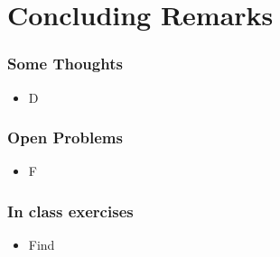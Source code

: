 \documentclass[10pt]{beamer}\usepackage[]{graphicx}\usepackage[]{color}
\begin{document}
\section{Concluding Remarks}

\begin{frame}
\frametitle{Some Thoughts}
\begin{itemize}
\item D
\end{itemize}
\end{frame}



\begin{frame}
\frametitle{Open Problems}
\begin{itemize}
\item F
\end{itemize}
\end{frame}



\begin{frame}
\frametitle{In class exercises}
\begin{itemize}
\item Find 
\end{itemize}
\end{frame}
\end{document}
